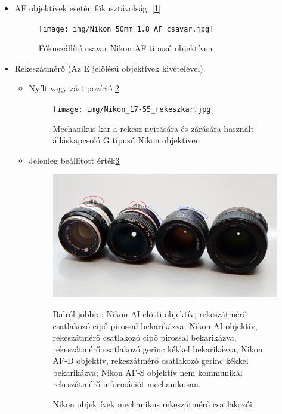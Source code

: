 \begin{itemize}
    \item AF objektívek esetén fókusztávolság. [\ref{fig:AF_csavar}]
    \begin{figure}[H]
    	\centering
    	\texttt{[image: img/Nikon\_50mm\_1.8\_AF\_csavar.jpg]}
    	\caption{Fókuszállító csavar Nikon AF típusú objektíven}
    	\label{fig:AF_csavar}
    \end{figure}
    \item Rekeszátmérő (Az E jelölésű objektívek kivételével).
    \begin{itemize}
        \item Nyílt vagy zárt pozíció \ref{fig:G_rekeszkar}
        \begin{figure}[H]
        	\centering
        	\texttt{[image: img/Nikon\_17-55\_rekeszkar.jpg]}
        	\caption{Mechanikus kar a rekesz nyitására és zárására használt álláskapcsoló G típusú Nikon objektíven}
        	\label{fig:G_rekeszkar}
        \end{figure}
        \item Jelenleg beállított érték\ref{fig:Exposure_coupleing}
        \begin{figure}[H]
        	\centering
        	\includegraphics[width=0.75\linewidth]{img/lenses-AI-and-non-AI.jpg}
        	\caption{Nikon objektívek mechanikus rekeszátmérő csatlakozói \cite{Legacy_lenses}}
            \medskip
            \Centering
            \small Balról jobbra: Nikon AI-elötti objektív, rekeszátmérő csatlakozó cipő pirossal bekarikázva; Nikon AI objektív,  rekeszátmérő csatlakozó cipő pirossal bekarikázva, rekeszátmérő csatlakozó gerinc kékkel bekarikázva; Nikon AF-D objektív, rekeszátmérő csatlakozó gerinc kékkel bekarikázva; Nikon AF-S objektív nem kommunikál rekeszátmérő információt mechanikusan.\cite{Legacy_lenses}
        	\label{fig:Exposure_coupleing}
        \end{figure}
    \end{itemize}
\end{itemize}

